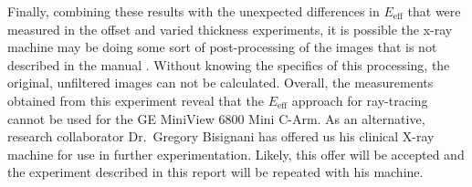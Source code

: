 Finally, combining these results with the unexpected differences in $E_{\text{eff}}$ that were measured in the offset and varied thickness experiments, it is possible the x-ray machine may be doing some sort of post-processing of the images that is not described in the manual \cite{CArm}. Without knowing the specifics of this processing, the original, unfiltered images can not be calculated. Overall, the measurements obtained from this experiment reveal that the $E_{\text{eff}}$ approach for ray-tracing cannot be used for the GE MiniView 6800 Mini C-Arm. As an alternative, research collaborator Dr.\ Gregory Bisignani has offered us his clinical X-ray machine for use in further experimentation. Likely, this offer will be accepted and the experiment described in this report will be repeated with his machine.

